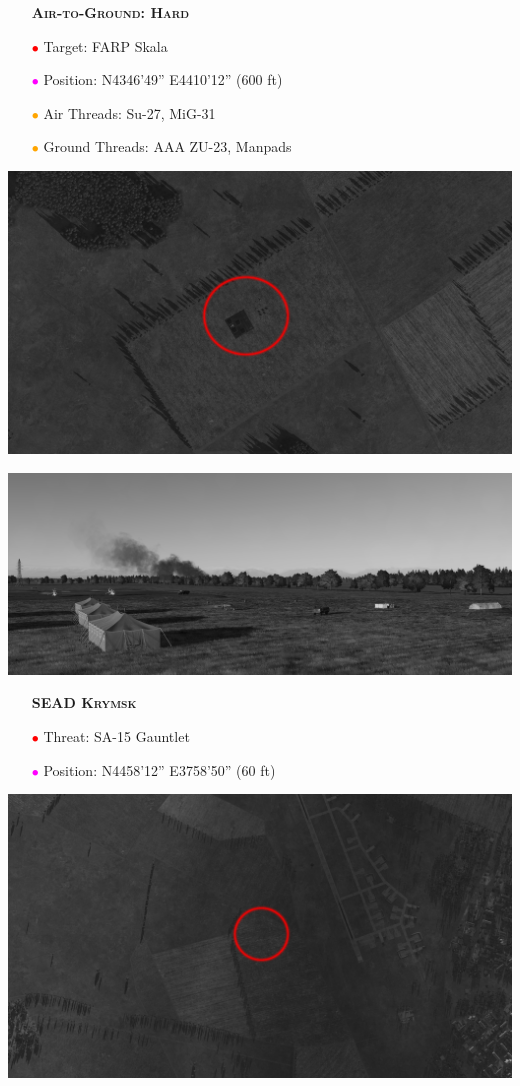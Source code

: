 \documentclass[a4paper,12pt,dvipsnames]{letter}
\newcommand{\Deg}{\textdegree{}}
\newcommand{\DMS}[3]{#1\Deg#2'#3''}
\newcommand{\myHead}[1]{{\LARGE\textsc{\textbf{#1}}}}
\newcommand{\ri}{\textcolor{Red}{$\bullet$\;}}
\newcommand{\mi}{\textcolor{Magenta}{$\bullet$\;}}
\newcommand{\oi}{\textcolor{Orange}{$\bullet$\;}}
\begin{document}
{\begin{center}
\end{center}
%
\newpage
\begin{itemize}
 \item[] \myHead{Air-to-Ground: Hard}
 \item[\ri] Target: FARP Skala
 \item[\mi] Position: N\DMS{43}{46}{49} E\DMS{44}{10}{12} (600 ft)
 \item[\oi] Air Threads: Su-27, MiG-31
 \item[\oi] Ground Threads: AAA ZU-23, Manpads
\end{itemize}
\begin{center}
 \includegraphics[width=0.7\linewidth]{../gimp/FARP_Skala_Sat.png}
\end{center}
%
\begin{center}
 \includegraphics[width=0.7\linewidth]{../gimp/FARP_Skala_Pic.png}
\end{center}
%
\vspace{0.5em}
\newpage
\begin{itemize}
 \item[] \myHead{SEAD Krymsk}
 \item[\ri] Threat: SA-15 Gauntlet
 \item[\mi] Position: N\DMS{44}{58}{12} E\DMS{37}{58}{50} (60 ft)
\end{itemize}
%
\begin{center}
\includegraphics[width=0.7\linewidth]{../gimp/SA15_Sat.png}

\end{center}}
\end{document}

